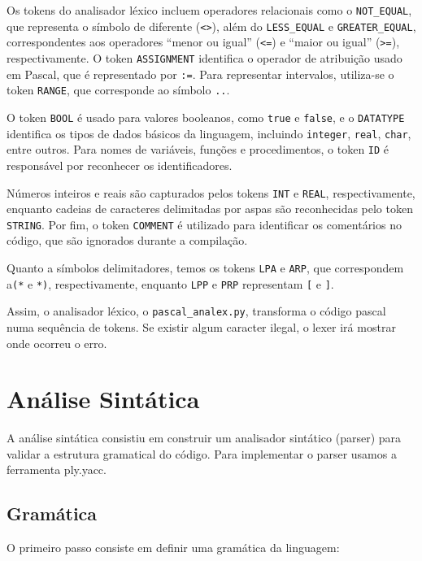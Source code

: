 \documentclass[12pt,a4paper]{report}
\begin{document}
Os tokens do analisador léxico incluem operadores relacionais como o \texttt{NOT\_EQUAL}, que representa o símbolo de diferente (\texttt{<>}), além do \texttt{LESS\_EQUAL} e \texttt{GREATER\_EQUAL}, correspondentes aos operadores “menor ou igual” (\texttt{<=}) e “maior ou igual” (\texttt{>=}), respectivamente. O token \texttt{ASSIGNMENT} identifica o operador de atribuição usado em Pascal, que é representado por \texttt{:=}. Para representar intervalos, utiliza-se o token \texttt{RANGE}, que corresponde ao símbolo \texttt{..}.

O token \texttt{BOOL} é usado para valores booleanos, como \texttt{true} e \texttt{false}, e o \texttt{DATATYPE} identifica os tipos de dados básicos da linguagem, incluindo \texttt{integer}, \texttt{real}, \texttt{char}, entre outros. Para nomes de variáveis, funções e procedimentos, o token \texttt{ID} é responsável por reconhecer os identificadores.

Números inteiros e reais são capturados pelos tokens \texttt{INT} e \texttt{REAL}, respectivamente, enquanto cadeias de caracteres delimitadas por aspas são reconhecidas pelo token \texttt{STRING}. Por fim, o token \texttt{COMMENT} é utilizado para identificar os comentários no código, que são ignorados durante a compilação.

Quanto a símbolos delimitadores, temos os tokens \texttt{LPA} e \texttt{ARP}, que correspondem a\texttt{(*} e \texttt{*)}, respectivamente, enquanto \texttt{LPP} e \texttt{PRP} representam \texttt{[} e \texttt{]}.

Assim, o analisador léxico, o \texttt{pascal\_analex.py}, transforma o código pascal numa sequência de tokens. Se existir algum caracter ilegal, o lexer irá mostrar onde ocorreu o erro.

\chapter{Análise Sintática}

A análise sintática consistiu em construir um analisador sintático (parser) para validar a estrutura gramatical do código. Para implementar o parser usamos a ferramenta ply.yacc.

\section{Gramática}
O primeiro passo consiste em definir uma gramática da linguagem:
\end{document}
